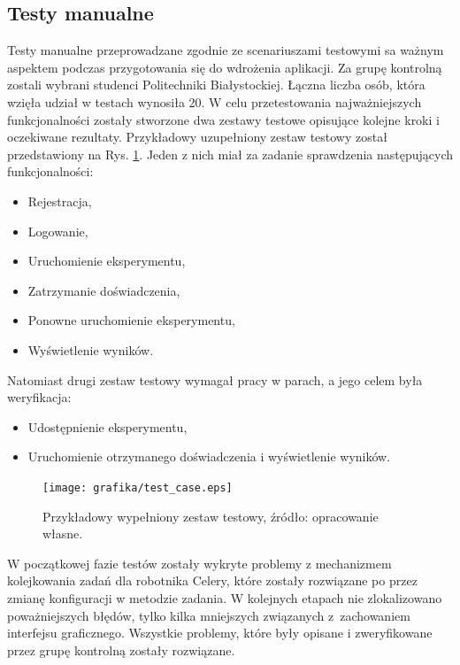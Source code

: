 \subsection{Testy manualne}
Testy manualne przeprowadzane zgodnie ze scenariuszami testowymi sa ważnym aspektem podczas przygotowania się do wdrożenia aplikacji. Za grupę kontrolną zostali wybrani studenci Politechniki Białystockiej. Łączna liczba osób, która wzięła udział w testach wynosiła 20. W celu przetestowania najważniejszych funkcjonalności zostały stworzone dwa zestawy testowe opisujące kolejne kroki i oczekiwane rezultaty. Przykładowy uzupełniony zestaw testowy został przedstawiony na Rys. \ref{rys21_test_case}. Jeden z nich miał za zadanie sprawdzenia następujących funkcjonalności: 
\begin{itemize}
	\item Rejestracja,
	\item Logowanie,
	\item Uruchomienie eksperymentu,
	\item Zatrzymanie doświadczenia,
	\item Ponowne uruchomienie eksperymentu,
	\item Wyświetlenie wyników.
\end{itemize}
Natomiast drugi zestaw testowy wymagał pracy w parach, a jego celem była weryfikacja: 
\begin{itemize}
 	\item Udostępnienie eksperymentu,
 	\item Uruchomienie otrzymanego doświadczenia i wyświetlenie wyników.
\end{itemize}

\begin{figure}[htb]
	\centering
	\texttt{[image: grafika/test\_case.eps]}
	\caption{Przykładowy wypełniony zestaw testowy, źródło: opracowanie własne.}
	\label{rys21_test_case}
\end{figure}

W początkowej fazie testów zostały wykryte problemy z mechanizmem kolejkowania zadań dla robotnika Celery, które zostały rozwiązane po przez zmianę konfiguracji w metodzie zadania. W kolejnych etapach nie zlokalizowano poważniejszych błędów, tylko kilka mniejszych związanych z~zachowaniem interfejsu graficznego. Wszystkie problemy, które były opisane i zweryfikowane przez grupę kontrolną zostały rozwiązane.